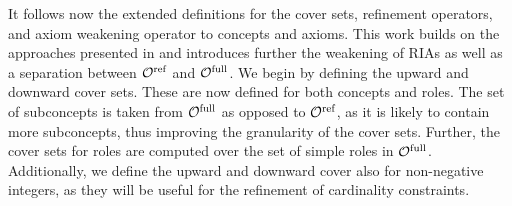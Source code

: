 
It follows now the extended definitions for the cover sets, refinement operators, and axiom weakening operator to \SROIQ concepts and axioms. This work builds on the approaches presented in \cite{confalonieri2020towards} and introduces further the weakening of RIAs as well as a separation between ${\mathcal{O}^\textnormal{ref}}$ and ${\mathcal{O}^\textnormal{full}}$. We begin by defining the upward and downward cover sets. These are now defined for both concepts and roles. The set of subconcepts is taken from ${\mathcal{O}^\textnormal{full}}$ as opposed to ${\mathcal{O}^\textnormal{ref}}$, as it is likely to contain more subconcepts, thus improving the granularity of the cover sets. Further, the cover sets for roles are computed over the set of simple roles in ${\mathcal{O}^\textnormal{full}}$. Additionally, we define the upward and downward cover also for non-negative integers, as they will be useful for the refinement of cardinality constraints.


